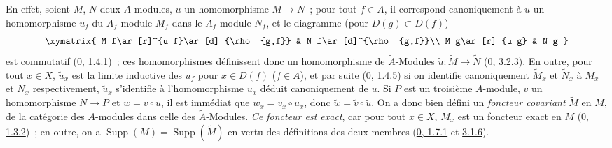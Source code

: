En effet, soient $M$, $N$ deux $A$-modules, $u$ un homomorphisme
$M\to N$~; pour tout $f\in A$, il correspond canoniquement à $u$ un
homomorphisme $u_f$ du $A_f$-module $M_f$ dans le $A_f$-module $N_f$, et le
diagramme (pour $D(g)\subset D(f)$)
\[
  \xymatrix{
    M_f\ar[r]^{u_f}\ar[d]_{\rho_{g,f}} & N_f\ar[d]^{\rho_{g,f}}\\
    M_g\ar[r]_{u_g} & N_g
  }
\]
est commutatif (\hyperref[0.1.4.1-fr]{0, 1.4.1})~; ces homomorphismes
définissent donc un homomorphisme de $\widetilde{A}$-Modules
$\widetilde{u}:\widetilde{M}\to\widetilde{N}$
(\hyperref[0.3.2.3-fr]{0, 3.2.3}). En outre, pour tout $x\in X$,
$\widetilde{u}_x$ est la limite inductive des $u_f$ pour $x\in D(f)$
($f\in A$), et par suite (\hyperref[0.1.4.5-fr]{0, 1.4.5}) si on identifie
canoniquement $\widetilde{M}_x$ et $\widetilde{N}_x$ à $M_x$ et $N_x$
respectivement, $\widetilde{u}_x$ s'identifie à l'homomorphisme $u_x$ déduit
canoniquement de $u$. Si $P$ est un troisième $A$-module, $v$ un
homomorphisme $N\to P$ et $w=v\circ u$, il est immédiat que
$w_x=v_x\circ u_x$, donc $\widetilde{w}=\widetilde{v}\circ\widetilde{u}$. On
a donc bien défini un \emph{foncteur covariant} $\widetilde{M}$ en $M$, de la
catégorie des $A$-modules dans celle des $\widetilde{A}$-Modules. \emph{Ce
foncteur est exact}, car pour tout $x\in X$, $M_x$ est un foncteur exact en
$M$ (\hyperref[0.1.3.2-fr]{0, 1.3.2})~; en outre, on a
$\operatorname{Supp}(M)=\operatorname{Supp}(\widetilde{M})$ en vertu des
définitions des deux membres (\hyperref[0.1.7.1-fr]{0, 1.7.1} et
\hyperref[0.3.1.6-fr]{3.1.6}).

